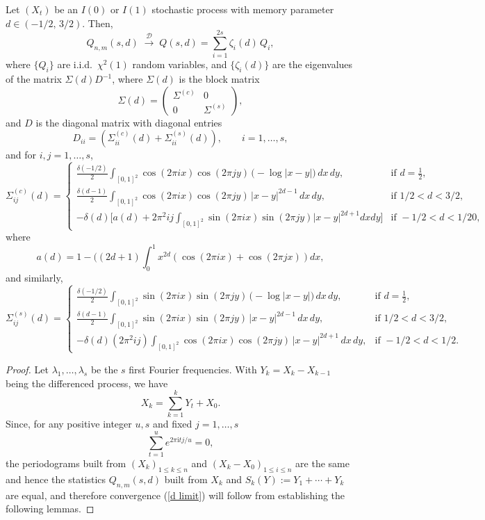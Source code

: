 \documentclass[10pt,a4paper]{amsart}
\def\i{\mathrm{i}}
\begin{document}
 \begin{thm}\label{Th1}
Let $(X_t)$ be an $I(0)$ or $I(1)$ stochastic process with memory parameter $d \in (-1/2,\,3/2)$. Then,
\begin{equation}\label{d limit}
Q_{n,m}(s,d) \;\overset{\mathcal{D}}{\longrightarrow}\;
Q(s,d) = \sum_{i=1}^{2s} \zeta_i(d)\, Q_i, 
\end{equation}
where $\{Q_i\}$ are i.i.d.\ $\chi^2(1)$ random variables, and $\{\zeta_i(d)\}$ are the eigenvalues of the  matrix
$\Sigma(d)D^{-1}$, where $\Sigma(d)$ is the block matrix
\begin{equation}\label{Sigma}
\Sigma(d) =
\begin{pmatrix}
\Sigma^{(c)} & 0\\[3pt]
0 &\Sigma^{(s)}
\end{pmatrix},
\end{equation}
and $D$ is the diagonal matrix with diagonal entries
$$D_{ii} =\left(\Sigma^{(c)}_{ii}(d) + \Sigma^{(s)}_{ii}(d)\right),\qquad i=1,\ldots,s,$$
and for $i,j=1,\ldots,s$, 
\[
\Sigma^{(c)}_{ij}(d) =
\begin{cases}
\displaystyle \frac{\delta(-1/2)}{2}\int_{[0,1]^2}\!\cos(2\pi i x)\cos(2\pi j y)\,
\bigl(-\log|x-y|\bigr)\,dx\,dy,
& \text{if } d=\tfrac{1}{2},\\[10pt]
\displaystyle\frac{\delta(d-1)}{2}\int_{[0,1]^2}\!\cos(2\pi i x)\cos(2\pi j y)\,
|x-y|^{2d-1}\,dx\,dy,
& \text{if } 1/2<d<3/2,\\[10pt]
-\delta(d)\Bigg[a(d)+
2\pi^2 i j\displaystyle\int_{[0,1]^2}\sin(2\pi ix)\sin(2\pi jy)\vert x- y\vert^{2d+1}dxdy\Bigg] 
& \text{if } -1/2<d<1/20,
\end{cases}
\]
where
$$
a(d)=1-((2d+1)\int_0^1x^{2d}\left(\cos(2\pi ix)+\cos(2\pi jx)\right)dx,
$$
and similarly,
\[
\Sigma^{(s)}_{ij}(d) =
\begin{cases}
\displaystyle\frac{\delta(-1/2)}{2} \int_{[0,1]^2}\!\sin(2\pi i x)\sin(2\pi j y)\,
\bigl(-\log|x-y|\bigr)\,dx\,dy,
& \text{if } d=\tfrac{1}{2},\\[10pt]
\frac{\delta(d-1)}{2}\displaystyle\int_{[0,1]^2}\!\sin(2\pi i x)\sin(2\pi j y)\,
|x-y|^{2d-1}\,dx\,dy,
& \text{if } 1/2<d<3/2,\\[10pt]
-\delta(d)(2\pi^2 ij)\displaystyle\int_{[0,1]^2}\!\cos(2\pi i x)\cos(2\pi j y)\,
|x-y|^{2d+1}\,dx\,dy,
& \text{if } -1/2<d<1/2.
\end{cases}
\]
\end{thm}

\begin{proof}
    

Let $\lambda_1,\ldots,\lambda_s$ be the $s$ first  Fourier frequencies. 
With $Y_k=X_k-X_{k-1}$ being the differenced process, we have
$$
X_k=\sum_{k=1}^kY_t+X_0.
$$
Since, for any positive integer $u,s$ and fixed $j=1,\ldots,s$
\begin{equation}\label{sumzero2}
\sum_{t=1}^ue^{2\pi \i tj/u}=0,
\end{equation}
the periodograms built from $(X_k)_{1\le k\le n}$ and $(X_k-X_0)_{1\le i\le n}$ are the same and hence the statistics $Q_{n,m}(s,d)$ built from $X_k$ and $S_k(Y):=Y_1+\cdots+Y_k$ are equal, and therefore
convergence (\ref{d limit}) will follow from establishing the following lemmas.
\end{proof}
\end{document}
